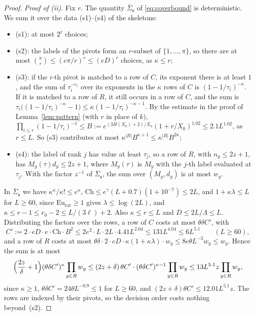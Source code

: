 \begin{proof}
\emph{Proof of (ii).} Fix $r$. The quantity $\bar\Sigma_{\mathfrak s}$ of \eqref{eq:coverbound} is deterministic. We sum
it over the data (s1)--(s4) of the skeletons:
\begin{itemize}
\item (s1): at most $2^r$ choices;
\item (s2): the labels of the pivots form an $r$-subset of $\{1,\dots,\pi\}$, so there are at most
  $\binom{\pi}{r}\le(e\pi/r)^r\le(eD)^r$ choices, as $\kappa\le r$;
\item (s3): if the $i$-th pivot is matched to a row of $C$, its exponent there is at least $1$, and the sum of
  $\tau_i^{-e_i}$ over its exponents in the $\kappa$ rows of $C$ is $(1-1/\tau_i)^{-\kappa}$. If it is matched to a row of
  $R$, it still occurs in a row of $C$, and the sum is $\tau_i\big((1-1/\tau_i)^{-\kappa}-1\big)\le\kappa(1-1/\tau_i)^{-\kappa-1}$.
  By the estimate in the proof of Lemma~\ref{lem:pattern} (with $r$ in place of $k$),
  $\prod_{i\le r}(1-1/\tau_i)^{-1}\le B:=e^{(3H(X_0)+2)/X_0}(1+r/X_0)^{1.02}\le2.1L^{1.02}$, as $r\le L$. So (s3)
  contributes at most $\kappa^{|R|}B^{\kappa+1}\le\kappa^{|R|}B^{2\kappa}$;
\item (s4): the label of rank $j$ has value at least $\tau_j$, so a row of $R$, with $n_y\le2z+1$, has
  $M_y(\tau)d_y\le2z+1$, where $M_y(\tau)$ is $M_y$ with the $j$-th label evaluated at $\tau_j$. With the factor $z^{-1}$
  of $\bar\Sigma_{\mathfrak s}$, the sum over $(M_y,d_y)$ is at most $w_y$.
\end{itemize}
In $\bar\Sigma_{\mathfrak s}$ we have $\kappa^\kappa/\kappa!\le e^\kappa$, $\mathrm{Ch}\le e^{\gamma}(L+0.7)(1+10^{-7})\le2L$,
and $1+\kappa\lambda\le L$ for $L\ge60$, since $\mathrm{Eu}_{\mathrm{rat}}\ge1$ gives $\lambda\le\log(2L)$, and
$\kappa\le r-1\le r_0-2\le L/(3\ell)+2$. Also $\kappa\le r\le L$ and $D\le2L/\Lambda\le L$. Distributing the factors over the rows, a row of $C$ costs at most $\theta\delta C'$, with
\[
  C':=2\cdot eD\cdot e\cdot\mathrm{Ch}\cdot B^2\le2e^2\cdot L\cdot2L\cdot4.41L^{2.04}\le131L^{4.04}\le6L^{5.1}\qquad(L\ge60),
\]
and a row of $R$ costs at most $\theta\delta\cdot2\cdot eD\cdot\kappa(1+\kappa\lambda)\cdot w_y\le8e\theta L^{-3}w_y\le w_y$.
Hence the sum is at most
\[
  \Bigl(\frac{2z}\delta+1\Bigr)(\theta\delta C')^{\kappa}\prod_{y\in R}w_y\le(2z+\delta)\,\theta C'\cdot(\theta\delta C')^{\kappa-1}
  \prod_{y\in R}w_y\le13L^{5.1}z\prod_{y\in R}w_y,
\]
since $\kappa\ge1$, $\theta\delta C'=24\theta L^{-0.9}\le1$ for $L\ge60$, and $(2z+\delta)\theta C'\le12.01L^{5.1}z$. The rows are indexed by their pivots, so the
decision order costs nothing beyond~(s2).


\end{proof}
